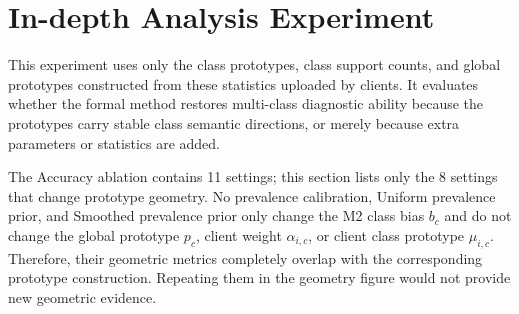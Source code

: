 \documentclass[letterpaper]{article}
\begin{document}




\section{In-depth Analysis Experiment}

This experiment uses only the class prototypes, class support counts, and global prototypes constructed from these statistics uploaded by clients. It evaluates whether the formal method restores multi-class diagnostic ability because the prototypes carry stable class semantic directions, or merely because extra parameters or statistics are added.


The Accuracy ablation contains 11 settings; this section lists only the 8 settings that change prototype geometry. No prevalence calibration, Uniform prevalence prior, and Smoothed prevalence prior only change the M2 class bias $b_c$ and do not change the global prototype $p_c$, client weight $\alpha_{i,c}$, or client class prototype $\mu_{i,c}$. Therefore, their geometric metrics completely overlap with the corresponding prototype construction. Repeating them in the geometry figure would not provide new geometric evidence.
\end{document}
